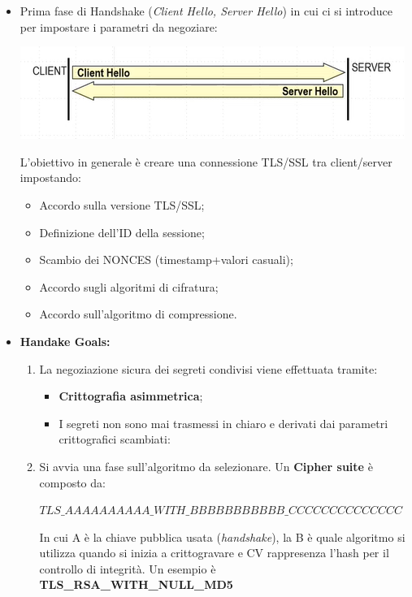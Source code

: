 \documentclass{book}
\theoremstyle{remark}
\begin{document}
\begin{itemize}
	\item Prima fase di Handshake (\emph{Client Hello, Server Hello}) in cui ci si introduce per impostare i parametri da negoziare:
	      \begin{center}
		      \includegraphics[scale=0.7]{2021-11-22-15-01-49.png}
	      \end{center}
	      L'obiettivo in generale è creare una connessione TLS/SSL tra client/server impostando:\begin{itemize}
		      \item Accordo sulla versione TLS/SSL;\@
		      \item Definizione dell'ID della sessione;\@
		      \item Scambio dei NONCES (timestamp+valori casuali);\@
		      \item Accordo sugli algoritmi di cifratura;\@
		      \item Accordo sull'algoritmo di compressione\@.
	      \end{itemize}
	\item \textbf{Handake Goals:}\begin{enumerate}
		      \item La negoziazione sicura dei segreti condivisi viene effettuata tramite:
		            \begin{itemize}
			            \item \textbf{Crittografia asimmetrica};\@
			            \item  I segreti non sono mai trasmessi in chiaro e derivati dai parametri crittografici scambiati:
		            \end{itemize}
		      \item Si avvia una fase sull'algoritmo da selezionare\@. Un \textbf{Cipher suite} è composto da:\begin{center}
			            \(TLS\_AAAAAAAAAA\_WITH\_BBBBBBBBBBB\_CCCCCCCCCCCCCC\)
		            \end{center}
		            In cui A è la chiave pubblica usata (\emph{handshake}), la B è quale algoritmo si utilizza quando si inizia a crittogravare e CV rappresenza l'hash per il controllo di integrità\@.
		            Un esempio è \textbf{TLS\_RSA\_WITH\_NULL\_MD5}
	      \end{enumerate}
\end{itemize}
\end{document}
